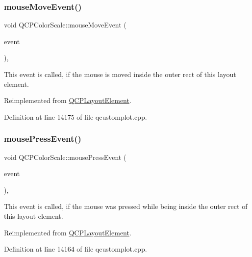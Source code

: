 \subsubsection{\texorpdfstring{mouse\+Move\+Event()}{mouseMoveEvent()}}
{\footnotesize\ttfamily void Q\+C\+P\+Color\+Scale\+::mouse\+Move\+Event (\begin{DoxyParamCaption}\item[{Q\+Mouse\+Event $\ast$}]{event }\end{DoxyParamCaption})\hspace{0.3cm}{\ttfamily [protected]}, {\ttfamily [virtual]}}

This event is called, if the mouse is moved inside the outer rect of this layout element. 

Reimplemented from \hyperlink{class_q_c_p_layout_element_a14f4acf58cdb8dd2c6c571479c4c4a40}{Q\+C\+P\+Layout\+Element}.



Definition at line 14175 of file qcustomplot.\+cpp.

\mbox{\label{class_q_c_p_color_scale_a5df6ad81b2ad045878d276c2d5be7120}} 
\subsubsection{\texorpdfstring{mouse\+Press\+Event()}{mousePressEvent()}}
{\footnotesize\ttfamily void Q\+C\+P\+Color\+Scale\+::mouse\+Press\+Event (\begin{DoxyParamCaption}\item[{Q\+Mouse\+Event $\ast$}]{event }\end{DoxyParamCaption})\hspace{0.3cm}{\ttfamily [protected]}, {\ttfamily [virtual]}}

This event is called, if the mouse was pressed while being inside the outer rect of this layout element. 

Reimplemented from \hyperlink{class_q_c_p_layout_element_a2d82ea21fe0ee628f177bd824bc51a71}{Q\+C\+P\+Layout\+Element}.



Definition at line 14164 of file qcustomplot.\+cpp.

\mbox{\label{class_q_c_p_color_scale_a0916613d20901950fc6d00c6f99fe0a1}} 
